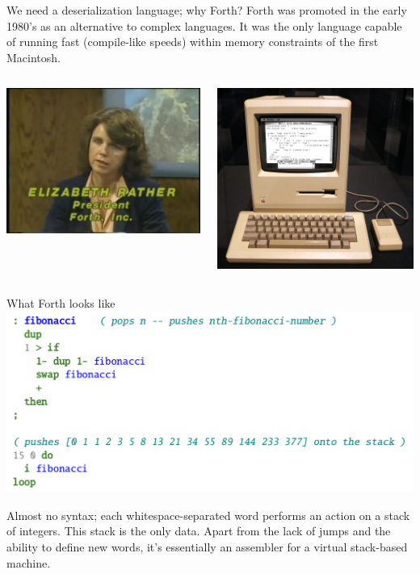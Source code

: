 \documentclass[aspectratio=169]{beamer}
\begin{document}
\begin{frame}{We need a deserialization language; why Forth?}
\vspace{0.5 cm}
Forth was promoted in the early 1980's as an alternative to complex languages. It was the only language capable of running fast (compile-like speeds) within memory constraints of the first Macintosh.

\vspace{0.5 cm}
\begin{columns}
\centering
\includegraphics[height=5 cm]{PLOTS/elizabeth-rather-the-computer-chronicles.png}

\centering
\includegraphics[height=5 cm]{PLOTS/macintosh-forth-code.jpg}
\end{columns}
\end{frame}

\begin{frame}{What Forth looks like}
\includegraphics[width=0.9\linewidth]{PLOTS/forth-example.png}

\vspace{0.5 cm}
Almost no syntax; each whitespace-separated word performs an action on a stack of integers. This stack is the only data. Apart from the lack of jumps and the ability to define new words, it's essentially an assembler for a virtual stack-based machine.
\end{frame}
\end{document}
